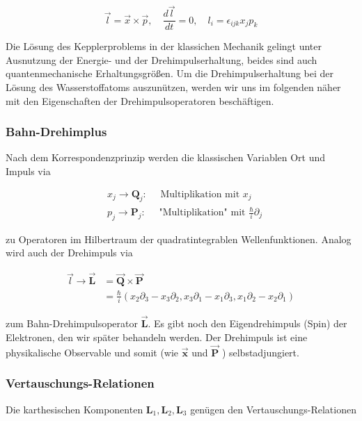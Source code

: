 \documentclass[10pt, letterpaper]{article}
\begin{document}
$$
\vec{l}=\vec{x} \times \vec{p}, \quad \frac{d \vec{l}}{d t}=0, \quad l_{i}=\epsilon_{i j k} x_{j} p_{k}
$$

Die Lösung des Kepplerproblems in der klassichen Mechanik gelingt unter Ausnutzung der Energie- und der Drehimpulserhaltung, beides sind auch quantenmechanische Erhaltungsgrößen. Um die Drehimpulserhaltung bei der Lösung des Wasserstoffatoms auszunützen, werden wir uns im folgenden näher mit den Eigenschaften der Drehimpulsoperatoren beschäftigen.

\subsubsection*{Bahn-Drehimplus}
Nach dem Korrespondenzprinzip werden die klassischen Variablen Ort und Impuls via

$$
\begin{aligned}
& x_{j} \rightarrow \mathbf{Q}_{j}: \quad \text { Multiplikation mit } x_{j} \\
& p_{j} \rightarrow \mathbf{P}_{j}: \quad \text { "Multiplikation" mit } \frac{\hbar}{i} \partial_{j}
\end{aligned}
$$

zu Operatoren im Hilbertraum der quadratintegrablen Wellenfunktionen. Analog wird auch der Drehimpuls via

$$
\begin{aligned}
\vec{l} \rightarrow \overrightarrow{\mathbf{L}} & =\overrightarrow{\mathbf{Q}} \times \overrightarrow{\mathbf{P}} \\
& =\frac{\hbar}{i}\left(x_{2} \partial_{3}-x_{3} \partial_{2}, x_{3} \partial_{1}-x_{1} \partial_{3}, x_{1} \partial_{2}-x_{2} \partial_{1}\right)
\end{aligned}
$$

zum Bahn-Drehimpulsoperator $\overrightarrow{\mathbf{L}}$. Es gibt noch den Eigendrehimpuls (Spin) der Elektronen, den wir später behandeln werden. Der Drehimpuls ist eine physikalische Observable und somit (wie $\overrightarrow{\mathbf{x}}$ und $\overrightarrow{\mathbf{P}}$ ) selbstadjungiert.

\subsubsection*{Vertauschungs-Relationen}
Die karthesischen Komponenten $\mathbf{L}_{1}, \mathbf{L}_{2}, \mathbf{L}_{3}$ genügen den Vertauschungs-Relationen
\end{document}
